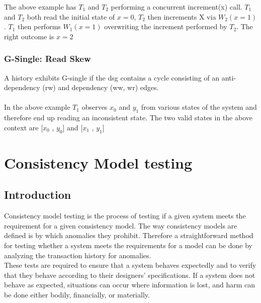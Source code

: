 \documentclass[a4paper,10pt,titlepage]{report}
\begin{document}
The above example has $T_1$ and $T_2$ performing a concurrent increment(x) call. $T_1$ and $T_2$ both read the initial state of $x=0$, $T_2$ then increments X via $W_2(x=1)$. $T_1$ then performs $W_1(x=1)$ overwriting the increment performed by $T_2$. The right outcome is $x = 2$

\subsection{G-Single: Read Skew}
A history exhibits G-single if the dsg contains a cycle consisting of an anti-dependency (rw) and dependency (ww, wr) edges.\\

\\
In the above example $T_1$ observes $x_0$ and $y_1$ from various states of the system and therefore end up reading an inconsistent state. The two valid states in the above context are [$x_0$ , $y_0$] and [$x_1$ , $y_1$]


\newpage

\chapter{Consistency Model testing}

\section{Introduction}
Consistency model testing is the process of testing if a given system meets the requirement for a given consistency model. The way consistency models are defined is by which anomalies they prohibit. Therefore a straightforward method for testing whether a system meets the requirements for a model can be done by analyzing the transaction history for anomalies.\\
\vspace{5mm}
These tests are required to ensure that a system behaves expectedly and to verify that they behave according to their designers' specifications. If a system does not behave as expected, situations can occur where information is lost, and harm can be done either bodily, financially, or materially. \\ \vspace{5mm}
\end{document}
